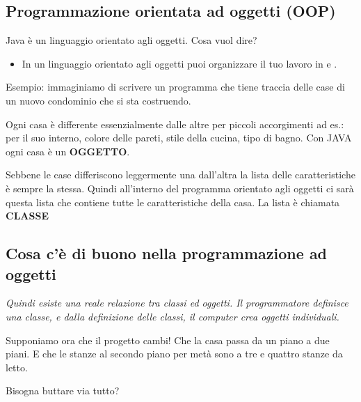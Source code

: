 \subsection{Programmazione orientata ad oggetti (OOP)}
\begin{frame}
\begin{block}{}
Java è un linguaggio orientato agli oggetti. Cosa vuol dire?
\end{block}
\begin{itemize}
\item In un linguaggio orientato agli oggetti puoi organizzare il tuo lavoro in  e .
\end{itemize}
Esempio: immaginiamo di scrivere un programma che tiene traccia delle case di un nuovo condominio che si sta costruendo.
\begin{block}{}
Ogni casa è differente essenzialmente dalle altre per piccoli accorgimenti ad es.: per il suo interno, colore delle pareti, stile della cucina, tipo di bagno. Con JAVA ogni casa è un \textbf{\alert{OGGETTO}}.
\end{block}
\begin{block}{}
Sebbene le case differiscono leggermente una dall'altra la lista delle caratteristiche è sempre la stessa. Quindi 
all'interno del programma orientato agli oggetti ci sarà questa lista che contiene tutte le caratteristiche
della casa. La lista è chiamata \textbf{\alert{CLASSE}}
\end{block}
\end{frame}

\subsection*{Cosa c'è di buono nella programmazione ad oggetti}
\begin{frame}
\begin{block}{}
\begin{center}
\itshape{Quindi esiste una reale relazione tra classi ed oggetti. Il programmatore definisce una classe, e dalla definizione
delle classi, il computer crea oggetti individuali.}
\end{center}
\end{block}
\pause
\begin{block}{}
Supponiamo ora che il progetto cambi! Che la casa passa da un piano a due piani. E che le stanze al secondo piano per metà sono 
a tre e quattro stanze da letto.
\end{block}
\pause
\begin{block}{}
Bisogna buttare via tutto?
\end{block}
\end{frame}

